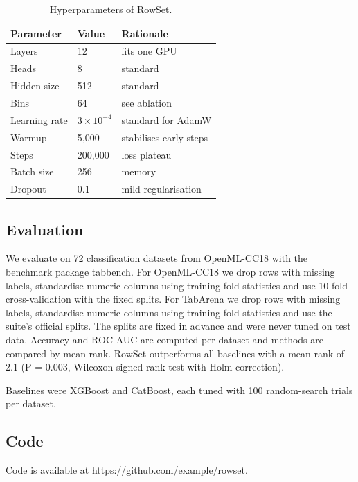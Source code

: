 \documentclass[11pt]{article}
\begin{document}
\begin{table}[h]
\centering
\begin{tabular}{lll}
\toprule
Parameter & Value & Rationale \\
\midrule
Layers & 12 & fits one GPU \\
Heads & 8 & standard \\
Hidden size & 512 & standard \\
Bins & 64 & see ablation \\
Learning rate & $3\times10^{-4}$ & standard for AdamW \\
Warmup & 5,000 & stabilises early steps \\
Steps & 200,000 & loss plateau \\
Batch size & 256 & memory \\
Dropout & 0.1 & mild regularisation \\
\bottomrule
\end{tabular}
\caption{Hyperparameters of RowSet.}
\label{tab:hparams}
\end{table}

\subsection{Evaluation}

We evaluate on 72 classification datasets from OpenML-CC18 with the benchmark package tabbench. For OpenML-CC18 we drop rows with missing labels, standardise numeric columns using training-fold statistics and use 10-fold cross-validation with the fixed splits. For TabArena we drop rows with missing labels, standardise numeric columns using training-fold statistics and use the suite's official splits. The splits are fixed in advance and were never tuned on test data. Accuracy and ROC AUC are computed per dataset and methods are compared by mean rank. RowSet outperforms all baselines with a mean rank of 2.1 (P = 0.003, Wilcoxon signed-rank test with Holm correction).

Baselines were XGBoost and CatBoost, each tuned with 100 random-search trials per dataset.

\subsection{Code}

Code is available at https://github.com/example/rowset.
\end{document}
